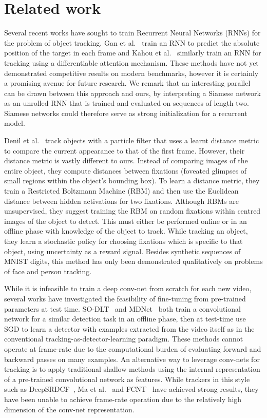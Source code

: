 \documentclass[runningheads]{llncs}
\begin{document}
\section{Related work}
Several recent works have sought to train Recurrent Neural Networks (RNNs) for the problem of object tracking.
Gan et al.~\cite{gan2015first} train an RNN to predict the absolute position of the target in each frame and Kahou et al.~\cite{kahou2015ratm} similarly train an RNN for tracking using a differentiable attention mechanism.
These methods have not yet demonstrated competitive results on modern benchmarks, however it is certainly a promising avenue for future research.
We remark that an interesting parallel can be drawn between this approach and ours, by interpreting a Siamese network as an unrolled RNN that is trained and evaluated on sequences of length two.
Siamese networks could therefore serve as strong initialization for a recurrent model.

Denil et al.~\cite{denil2012learning} track objects with a particle filter that uses a learnt distance metric to compare the current appearance to that of the first frame.
However, their distance metric is vastly different to ours.
Instead of comparing images of the entire object, they compute distances between fixations (foveated glimpses of small regions within the object's bounding box).
To learn a distance metric, they train a Restricted Boltzmann Machine (RBM) and then use the Euclidean distance between hidden activations for two fixations.
Although RBMs are unsupervised, they suggest training the RBM on random fixations within centred images of the object to detect.
This must either be performed online or in an offline phase with knowledge of the object to track.
While tracking an object, they learn a stochastic policy for choosing fixations which is specific to that object, using uncertainty as a reward signal.
Besides synthetic sequences of MNIST digits, this method has only been demonstrated qualitatively on problems of face and person tracking.

While it is infeasible to train a deep conv-net from scratch for each new video, several works have investigated the feasibility of fine-tuning from pre-trained parameters at test time.
SO-DLT~\cite{wang2015transferring} and MDNet~\cite{nam2015learning} both train a convolutional network for a similar detection task in an offline phase, then at test-time use SGD to learn a detector with examples extracted from the video itself as in the conventional tracking-as-detector-learning paradigm.
These methods cannot operate at frame-rate due to the computational burden of evaluating forward and backward passes on many examples.
An alternative way to leverage conv-nets for tracking is to apply traditional shallow methods using the internal representation of a pre-trained convolutional network as features.
While trackers in this style such as DeepSRDCF~\cite{danelljan2015convolutional}, Ma et al.~\cite{ma2015hierarchical} and FCNT~\cite{wang2015visual} have achieved strong results, they have been unable to achieve frame-rate operation due to the relatively high dimension of the conv-net representation.
\end{document}
